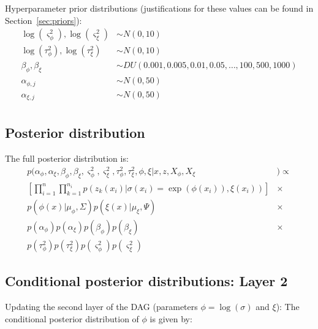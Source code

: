 \documentclass{article}
\begin{document}
Hyperparameter prior distributions (justifications for these values can be found in Section~\ref{sec:priors}):
\begin{align*}
\log(\varsigma^2_\phi), \log(\varsigma^2_\xi)&\sim N(0, 10) \\
\log(\tau^2_\phi), \log(\tau^2_\xi) &\sim N(0, 10) \\
\beta_\phi, \beta_\xi &\sim DU(0.001, 0.005, 0.01, 0.05, \dots , 100, 500, 1000)\\
\alpha_{\phi,j} &\sim N(0, 50)\\
\alpha_{\xi,j} &\sim N(0, 50)\\
\end{align*}


\subsection*{Posterior distribution}

The full posterior distribution is:
\begin{align*}
p(\alpha_\phi, \alpha_\xi, \beta_\phi, \beta_\xi, \varsigma^2_\phi, \varsigma^2_\xi, \tau^2_\phi, \tau^2_\xi, \phi, \xi | x, z, X_\phi, X_\xi &) \propto \\
\left[ \prod_{i=1}^n \prod_{k=1}^{n_i} p(z_k(x_i) | \sigma(x_i)=\exp(\phi(x_i)), \xi(x_i)) \right] & \times \\
p(\phi(x) | \mu_\phi, \Sigma) p(\xi(x) | \mu_\xi, \Psi) & \times \\
p(\alpha_\phi) p(\alpha_\xi) p(\beta_\phi) p(\beta_\xi) & \times \\
p(\tau^2_\phi) p(\tau^2_\xi) p(\varsigma^2_\phi) p(\varsigma^2_\xi) &
\end{align*}

\subsection*{Conditional posterior distributions: Layer 2}

Updating the second layer of the DAG (parameters $\phi = \log(\sigma)$ and $\xi$): The conditional posterior distribution of $\phi$ is given by:
\end{document}
